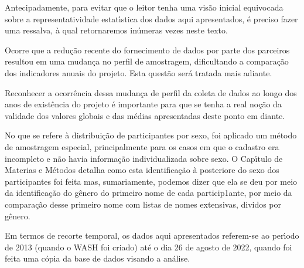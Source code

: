\documentclass[
12pt,		%
openright,	%
twoside,  %
a4paper,			%
chapter=TITLE,		%
english,			%
french,				%
spanish,			%
brazil				%
]{USPSC-classe/USPSC}
\begin{document}
Antecipadamente, para evitar que o leitor tenha uma vis\~ao inicial equivocada sobre a representatividade estat\'{\i}stica dos dados aqui apresentados, \'e preciso fazer uma ressalva, \`a qual retornaremos in\'umeras vezes neste texto.














Ocorre que a redu\c{c}\~ao recente do fornecimento de dados por parte dos parceiros resultou em uma mudan\c{c}a no perfil de amostragem, dificultando a compara\c{c}\~ao dos indicadores anuais do projeto. Esta quest\~ao ser\'a tratada mais adiante.














Reconhecer a ocorr\^encia dessa mudan\c{c}a de perfil da coleta de dados ao longo dos anos de exist\^encia do projeto \'e importante para que se tenha a real no\c{c}\~ao da validade dos valores globais e das m\'edias apresentadas deste ponto em diante.














No que se refere \`a distribui\c{c}\~ao de participantes por sexo, foi aplicado um m\'etodo de amostragem especial, principalmente para os casos em que o cadastro era incompleto e n\~ao havia informa\c{c}\~ao individualizada sobre sexo. O Cap\'{\i}tulo de Materias e M\'etodos detalha como esta identifica\c{c}\~ao \`a posteriore do sexo dos participantes foi feita mas, sumariamente, podemos dizer que ela se deu por meio da identifica\c{c}\~ao do g\^enero do primeiro nome de cada particip1ante, por meio da compara\c{c}\~ao desse primeiro nome com listas de nomes extensivas, dividos por g\^enero.














Em termos de recorte temporal, os dados aqui apresentados referem-se ao per\'{\i}odo de 2013 (quando o WASH foi criado) at\'e o dia 26 de agosto de 2022, quando foi feita uma c\'opia da base de dados visando a an\'alise.
\end{document}
